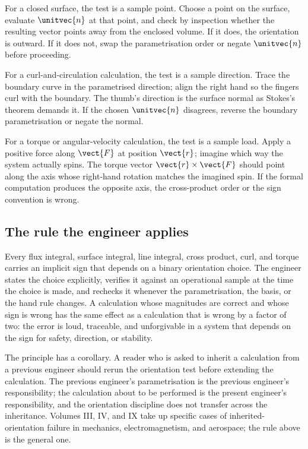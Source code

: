 For a closed surface, the test is a sample point. Choose a point on
the surface, evaluate $\unitvec{n}$ at that point, and check by
inspection whether the resulting vector points away from the
enclosed volume. If it does, the orientation is outward. If it does
not, swap the parametrisation order or negate $\unitvec{n}$ before
proceeding.

For a curl-and-circulation calculation, the test is a sample
direction. Trace the boundary curve in the parametrised direction;
align the right hand so the fingers curl with the boundary. The
thumb's direction is the surface normal as Stokes's theorem demands
it. If the chosen $\unitvec{n}$ disagrees, reverse the boundary
parametrisation or negate the normal.

For a torque or angular-velocity calculation, the test is a sample
load. Apply a positive force along $\vect{F}$ at position $\vect{r}$;
imagine which way the system actually spins. The torque vector
$\vect{r} \times \vect{F}$ should point along the axis whose
right-hand rotation matches the imagined spin. If the formal
computation produces the opposite axis, the cross-product order or
the sign convention is wrong.

\subsection{The rule the engineer applies}

\begin{principle}
Every flux integral, surface integral, line integral, cross product,
curl, and torque carries an implicit sign that depends on a binary
orientation choice. The engineer states the choice explicitly,
verifies it against an operational sample at the time the choice is
made, and rechecks it whenever the parametrisation, the basis, or the
hand rule changes. A calculation whose magnitudes are correct and
whose sign is wrong has the same effect as a calculation that is
wrong by a factor of two: the error is loud, traceable, and
unforgivable in a system that depends on the sign for safety,
direction, or stability.
\end{principle}

The principle has a corollary. A reader who is asked to inherit a
calculation from a previous engineer should rerun the orientation
test before extending the calculation. The previous engineer's
parametrisation is the previous engineer's responsibility; the
calculation about to be performed is the present engineer's
responsibility, and the orientation discipline does not transfer
across the inheritance. Volumes III, IV, and IX take up specific
cases of inherited-orientation failure in mechanics, electromagnetism,
and aerospace; the rule above is the general one.

